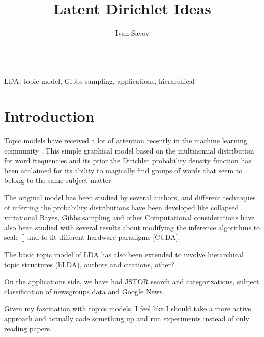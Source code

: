 \documentclass[letterpaper,12pt]{article}
\author{Ivan Savov}
\title{ {\LARGE Latent Dirichlet Ideas } }
\begin{document}
\maketitle


\ \\
 LDA, topic model, Gibbs sampling, applications, hierarchical


\section{Introduction}

	Topic models have received a lot of attention recently in the machine learning 
	community \cite{Blei2003,Blei2009}.
	This simple graphical model based on the multinomial distribution for word frequencies 
	and its prior the Dirichlet probability density function has been acclaimed for
	its ability to magically find groups of words that seem to belong to the same subject matter.
	
	
	The original model has been studied by several authors, and different 
	techniques of inferring the probability distributions have been developed
	like collapsed variational Bayes, Gibbs sampling and other
	Computational considerations have also been studied with several results
	about modifying the inference algorithms to scale [] and to fit 
	different hardware paradigms [CUDA].
	
	The basic topic model of LDA has also been extended to involve hierarchical 
	topic structures (hLDA), authors and citations,  other? 
	\bigskip
	\bigskip
	
	On the applications side, we have had JSTOR search and categorizations,
	subject classification of newsgroups data and Google News. 
	\bigskip
	\bigskip
	
	Given my fascination with topics models, I feel like I should take a more
	active approach and actually code something up and run experiments 
	instead of only reading papers.
	
\end{document}
